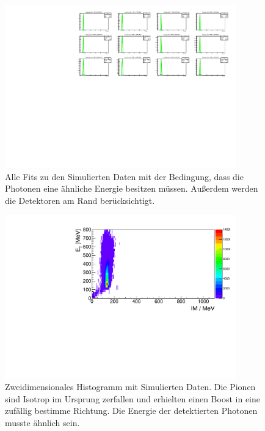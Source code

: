 \documentclass[a4paper,11pt,oneside,final,german,openbib,pdftex]{scrbook}
\begin{document}
{\begin{appendix}
\begin{figure}[h!]
	\begin{center}
		\includegraphics[width=100mm]{NewCalib/20171904Sim30DegreeCutAllFits}
		\caption[Simulation: Alle Fits ohne Detektoren am Rand]{Alle Fits zu den Simulierten Daten mit der Bedingung, dass die Photonen eine \"ahnliche Energie besitzen m\"ussen. Au{\ss}erdem werden die Detektoren am Rand ber\"ucksichtigt.}
		\label{fig:Sim-30-Degree-Cut-All-Fits}
	\end{center}
\end{figure}

\begin{figure}[h!]
	\begin{center}
		\includegraphics[width=100mm]{NewCalib/UrsprungIsotrop/20171904SimUrsprungIsotropNoCutHist}
		\caption[Simulation: 2D-Hist Isotroper Boost im Ursprung ]{Zweidimensionales Histogramm mit Simulierten Daten. Die Pionen sind Isotrop im Ursprung zerfallen und erhielten einen Boost in eine zuf\"allig bestimme Richtung. Die Energie der detektierten Photonen musste \"ahnlich sein.}
		\label{fig:Sim-Data-Ursprung-2DHist-No-Cut}
	\end{center}
\end{figure}


\end{appendix}}
\end{document}
